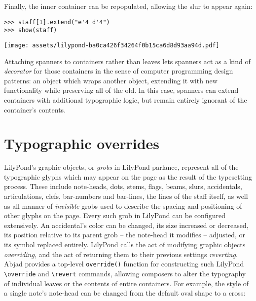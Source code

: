\noindent Finally, the inner container can be repopulated, allowing the slur to
appear again:

\begin{comment}
<abjad>
staff[1].extend("e'4 d'4")
show(staff)
</abjad>
\end{comment}

\begin{abjadbookoutput}
\begin{singlespacing}
\vspace{-0.5\baselineskip}
\begin{lstlisting}
>>> staff[1].extend("e'4 d'4")
>>> show(staff)
\end{lstlisting}
\noindent\texttt{[image: assets/lilypond-ba0ca426f34264f0b15ca6d8d93aa94d.pdf]}
\end{singlespacing}
\end{abjadbookoutput}

\noindent Attaching spanners to containers rather than leaves lets spanners act
as a kind of \emph{decorator} for those containers in the sense of computer
programming design patterns: an object which wraps another object, extending it
with new functionality while preserving all of the old. In this case, spanners
can extend containers with additional typographic logic, but remain entirely
ignorant of the container's contents.

\section{Typographic overrides}
\label{sec:typographic-overrides}

LilyPond's graphic objects, or \emph{grobs} in LilyPond parlance, represent all
of the typographic glyphs which may appear on the page as the result of the
typesetting process. These include note-heads, dots, stems, flags, beams,
slurs, accidentals, articulations, clefs, bar-numbers and bar-lines, the lines
of the staff itself, as well as all manner of \emph{invisible} grobs used
to describe the spacing and positioning of other glyphs on the page. Every such
grob in LilyPond can be configured extensively. An accidental's color can be
changed, its size increased or decreased, its position relative to its parent
grob -- the note-head it modifies -- adjusted, or its symbol replaced entirely.
LilyPond calls the act of modifying graphic objects \emph{overriding}, and the
act of returning them to their previous settings \emph{reverting}. Abjad
provides a top-level \texttt{override()} function for constructing such
LilyPond \texttt{\textbackslash{}override} and \texttt{\textbackslash{}revert}
commands, allowing composers to alter the typography of individual leaves or
the contents of entire containers. For example, the style of a single note's
note-head can be changed from the default oval shape to a cross:

